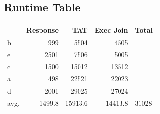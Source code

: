 \documentclass[a4paper,11pt,twoside]{article}
\begin{document}
\subsection*{Runtime Table}
\label{sec:orga248a39}
\begin{center}
\begin{tabular}{lrrrl}
 & Response & TAT & Exec Join & Total\\[0pt]
\hline
b & 999 & 5504 & 4505 & \\[0pt]
e & 2501 & 7506 & 5005 & \\[0pt]
c & 1500 & 15012 & 13512 & \\[0pt]
a & 498 & 22521 & 22023 & \\[0pt]
d & 2001 & 29025 & 27024 & \\[0pt]
\hline
avg. & 1499.8 & 15913.6 & 14413.8 & 31028\\[0pt]
\end{tabular}
\end{center}
\end{document}
